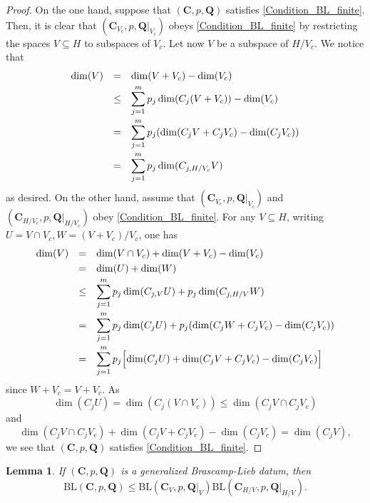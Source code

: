 \documentclass[11pt,a4paper,reqno]{amsart}
\numberwithin{equation}{section}
\newtheorem{lemma}[theorem]{Lemma}
\theoremstyle{definition}
\newcommand{\nm}{\noalign{\smallskip}}
\newcommand{\ds}{\displaystyle}
\newcommand{\<}{\ensuremath \leq}
\renewcommand{\>}{\ensuremath \geq}
\begin{document}
\begin{proof}
    On the one hand, suppose that $(\textbf{C},p,\textbf{Q})$ satisfies \cref{Condition_BL_finite}. Then, it is clear that $(\textbf{C}_{V_c},p,\textbf{Q}|_{V_c})$ obeys \cref{Condition_BL_finite} by restricting the spaces $V \subseteq H$ to subspaces of $V_c.$ Let now $V$ be a subspace of $H/V_c.$ We notice that $$\begin{array}{lll}
    \dim(V) &=& \dim(V+V_c)-\dim(V_c) \\
    \nm 
    &\leq& \ds \sum_{j=1}^m p_j\dim(C_j(V+V_c))-\dim(V_c) \\
    \nm 
    &=& \ds \sum_{j=1}^m p_j(\dim(C_jV+C_jV_c)-\dim(C_jV_c)) \\
    \nm 
    &=& \ds \sum_{j=1}^m p_j \dim(C_{j,H/V_c}V)
    \end{array}$$ as desired. On the other hand, assume that $(\textbf{C}_{V_c},p,\textbf{Q}|_{V_c})$ and $(\textbf{C}_{H/V_c},p,\textbf{Q}|_{H/V_c})$ obey \cref{Condition_BL_finite}. For any $V \subseteq H$, writing $U=V \cap V_c, W=(V+V_c)/V_c$, one has $$\begin{array}{lll}
    \dim(V) &=& \dim(V \cap V_c)+\dim(V+V_c)-\dim(V_c) \\
    \nm 
    &=& \dim(U)+\dim(W) \\
    \nm
    &\leq& \ds \sum_{j=1}^m p_j \dim(C_{j,V}U)+p_j \dim(C_{j,H/V}W) \\
    \nm 
    &=& \ds \sum_{j=1}^m p_j \dim(C_jU)+p_j(\dim(C_jW+C_jV_c)-\dim(C_jV_c)) \\
    \nm 
    &=& \ds \sum_{j=1}^m p_j \Bigl[ \dim(C_jU)+\dim(C_jV+C_jV_c)-\dim(C_jV_c) \Bigl]
    \end{array}$$ since $W+V_c=V+V_c.$ As $$\dim(C_jU)=\dim(C_j(V \cap V_c)) \leq \dim(C_jV \cap C_jV_c)$$ and $$\dim(C_jV \cap C_jV_c)+\dim(C_jV+C_jV_c)-\dim(C_jV_c)=\dim(C_jV),$$ we see that $(\textbf{C},p,\textbf{Q})$ satisfies \cref{Condition_BL_finite}.  
\end{proof}

\begin{lemma}
    If $(\textbf{C},p,\textbf{Q})$ is a generalized Brascamp-Lieb datum, then $$\mathrm{BL}(\textbf{C},p,\textbf{Q}) \leq \mathrm{BL}(\textbf{C}_V,p,\textbf{Q}|_V)\mathrm{BL}(\textbf{C}_{H /V},p,\textbf{Q}|_{H/V}).$$
\end{lemma}
\end{document}
